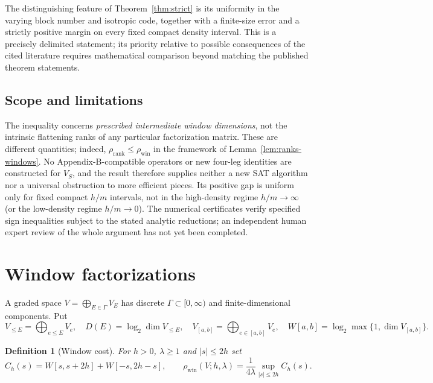 \documentclass[10pt,a4paper]{article}
\numberwithin{equation}{section}
\newtheorem{definition}[theorem]{Definition}
\theoremstyle{remark}\newtheorem{remark}[theorem]{Remark}\newtheorem{question}[theorem]{Question}
\newcommand{\rhow}{\rho_{\mathrm{win}}}\newcommand{\F}{\mathbb F}\newcommand{\K}{\mathbb K}\newcommand{\Z}{\mathbb Z}\newcommand{\R}{\mathbb R}\newcommand{\cB}{\mathcal L}\newcommand{\wt}{\mathrm{wt}}\newcommand{\dimn}{\operatorname{dim}}\newcommand{\supp}{\operatorname{supp}}
\begin{document}
The distinguishing feature of Theorem~\ref{thm:strict} is its
uniformity in the varying block number and isotropic code, together
with a finite-size error and a strictly positive margin on every
fixed compact density interval. This is a precisely delimited
statement; its priority relative to possible consequences of the
cited literature requires mathematical comparison beyond matching
the published theorem statements.

\subsection{Scope and limitations}\label{sec:scope}
The inequality concerns \emph{prescribed intermediate window
dimensions}, not the intrinsic flattening ranks of any particular
factorization matrix. These are different quantities; indeed,
$\rho_{\mathrm{rank}}\le\rho_{\mathrm{win}}$ in the framework of
Lemma~\ref{lem:ranks-windows}. No Appendix-B-compatible operators or
new four-leg identities are constructed for $V_S$, and the result
therefore supplies neither a new SAT algorithm nor a universal
obstruction to more efficient pieces. Its positive gap is uniform
only for fixed compact $h/m$ intervals, not in the high-density
regime $h/m\to\infty$ (or the low-density regime $h/m\to0$).
The numerical certificates verify specified sign inequalities
subject to the stated analytic reductions; an independent human
expert review of the whole argument has not yet been completed.

\section{Window factorizations}\label{sec:windows}
A graded space $V=\bigoplus_{E\in\Gamma}V_E$ has discrete $\Gamma\subset[0,\infty)$ and finite-dimensional components. Put
\[
V_{\le E}=\bigoplus_{e\le E}V_e,\quad D(E)=\log_2\dimn V_{\le E},\quad
V_{[a,b]}=\bigoplus_{e\in[a,b]}V_e,\quad W[a,b]=\log_2\max\{1,\dimn V_{[a,b]}\}.
\]
\begin{definition}[Window cost]\label{def:windows}
For $h>0$, $\lambda\ge1$ and $|s|\le2h$ set
\[
C_h(s)=W[s,s+2h]+W[-s,2h-s],\qquad
\rhow(V;h,\lambda)=\frac1{4\lambda}\sup_{|s|\le2h}C_h(s).
\]
\end{definition}
\end{document}

